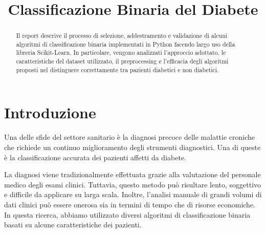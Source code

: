 \documentclass[conference]{IEEEtran}
\begin{document}
\title{Classificazione Binaria del Diabete}

\author{
\and
{}
\and
{}
\and
{}
\and
{}
}

\maketitle

\begin{abstract}
Il report descrive il processo di selezione, addestramento e validazione di alcuni algoritmi di classificazione binaria implementati in Python facendo largo uso della libreria Scikit-Learn.
In particolare, vengono analizzati l’approccio adottato, le caratteristiche del dataset utilizzato, il preprocessing e l’efficacia degli algoritmi proposti nel distinguere correttamente tra pazienti diabetici e non diabetici.
\end{abstract}

\section{Introduzione}

Una delle sfide del settore sanitario è la diagnosi precoce delle malattie croniche che richiede un continuo miglioramento degli strumenti diagnostici. Una di queste è la classificazione accurata dei pazienti affetti da diabete. %

La diagnosi viene tradizionalmente effettuata grazie alla valutazione del personale medico degli esami clinici. Tuttavia, questo metodo può risultare lento, soggettivo e difficile da applicare su larga scala. Inoltre, l’analisi manuale di grandi volumi di dati clinici può essere onerosa sia in termini di tempo che di risorse economiche. 
In questa ricerca, abbiamo utilizzato diversi algoritmi di classificazione binaria basati su alcune caratteristiche dei pazienti.
\end{document}
